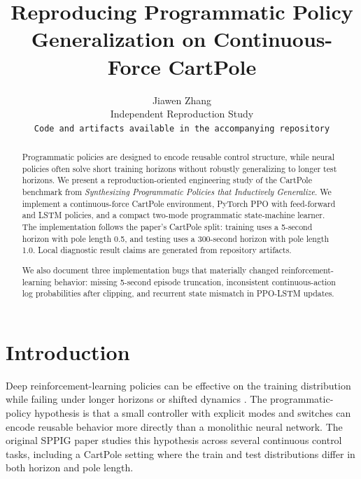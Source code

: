 \documentclass[letterpaper,twocolumn,10pt]{article}
\begin{document}
\title{Reproducing Programmatic Policy Generalization on Continuous-Force CartPole}
\date{}

\author{Jiawen Zhang\\
Independent Reproduction Study\\
{\tt Code and artifacts available in the accompanying repository}}

\maketitle

\begin{abstract}
Programmatic policies are designed to encode reusable control structure, while
neural policies often solve short training horizons without robustly
generalizing to longer test horizons.  We present a reproduction-oriented
engineering study of the CartPole benchmark from \emph{Synthesizing
Programmatic Policies that Inductively Generalize}.  We implement a
continuous-force CartPole environment, PyTorch PPO with feed-forward and LSTM
policies, and a compact two-mode programmatic state-machine learner.  The
implementation follows the paper's CartPole split: training uses a 5-second
horizon with pole length 0.5, and testing uses a 300-second horizon with pole
length 1.0.  Local diagnostic result claims are generated from repository
artifacts.

We also document three implementation bugs that materially changed
reinforcement-learning behavior: missing 5-second episode truncation,
inconsistent continuous-action log probabilities after clipping, and recurrent
state mismatch in PPO-LSTM updates.
\end{abstract}


\section{Introduction}

Deep reinforcement-learning policies can be effective on the training
distribution while failing under longer horizons or shifted dynamics
\citep{packer2018generalization}.  The programmatic-policy hypothesis is that a
small controller with explicit modes and switches can encode reusable behavior
more directly than a monolithic neural network.  The original SPPIG paper
\citep{inala2020sppig} studies this hypothesis across several continuous
control tasks, including a CartPole setting where the train and test
distributions differ in both horizon and pole length.
\end{document}
